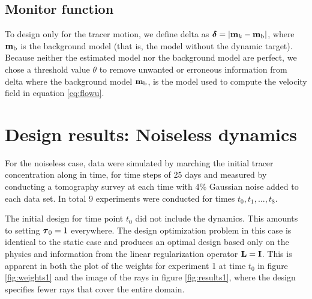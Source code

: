 \documentclass[11pt]{article}
\begin{document}
\subsection{Monitor function}

To design only for the tracer motion, we define delta as ${ \boldsymbol \delta} = |{\bf{m}}_{k} -{\bf{m}}_{\text{b}}|$,
where ${\bf{m}}_{\rm b}$ is the background model (that is, the model without the dynamic target).
 Because  neither the estimated model nor the background model are perfect, we  chose a threshold value $\theta$ to remove unwanted or erroneous information from delta 
where the background model ${\bf{m}}_{\text{b}} $, is the model used to compute the velocity field in equation \eqref{eq:flowu}.

\section{Design results: Noiseless dynamics}
\label{sec:Results}
For the noiseless case, data were simulated by marching  the initial tracer concentration along in time, for time steps of 25 days and measured by conducting a tomography survey at each time with 4\% Gaussian noise added to each data set. In total 9 experiments were conducted for times $t_0,t_1,...,t_8$. 


The initial design for time point $t_0$ did not include the dynamics. This amounts to  setting ${\boldsymbol \tau}_0 = 1$ everywhere. The design optimization problem in this case is  identical to the static case and produces an optimal design based only on the physics and information from the linear regularization operator ${\bf{L}} = {\bf{I}}$. This is apparent in both the plot of the weights for experiment 1 at time  $t_0$ in figure \ref{fig:weights1} and the image of the rays in figure \ref{fig:results1}, where the design specifies fewer rays that cover the entire domain. 
\end{document}
